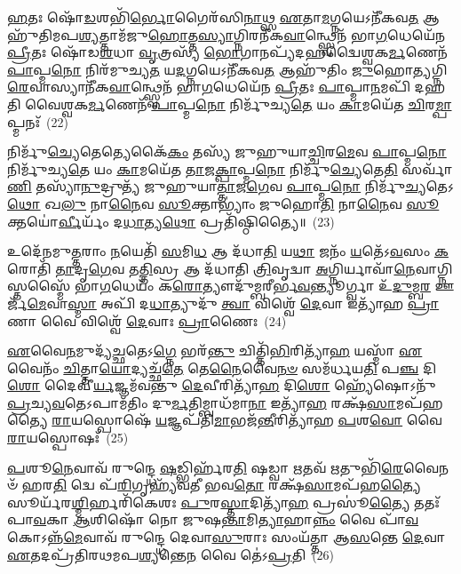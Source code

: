 \-\ul{𑌹}\-𑌤𑌃 𑌷𑍋᳴\-\ul{𑌡}\-𑌶𑌭𑌿᳴\-\ul{𑌰𑍍𑌭𑍋}\-𑌗𑍈𑌰᳴𑌸𑌿\-\ul{𑌨𑌾}\-𑌥𑍍𑌸 \ul{𑌏}\-𑌤𑌾\-\ul{𑌮}\-𑌗𑍍𑌨𑌯𑍇\-𑌽𑌨𑍀᳴𑌕𑌵\-\ul{𑌤} 𑌆𑌹𑍁᳴𑌤𑌿𑌮𑌪\-\ul{𑌶𑍍𑌯}\-𑌤𑍍𑌤𑌾𑌮᳴𑌜𑍁\-\ul{𑌹𑍋}\-𑌤𑍍𑌤\-\ul{𑌸𑍍𑌯𑌾}\-𑌗𑍍𑌨𑌿𑌰𑌨𑍀᳴𑌕\-\ul{𑌵𑌾}\-𑌨𑍍𑌥𑍍𑌸𑍍𑌵𑍇𑌨᳴ 𑌭𑌾\-\ul{𑌗}\-𑌧𑍇𑌯𑍇᳴𑌨 \ul{𑌪𑍍𑌰𑍀}\-𑌤𑌃 𑌷𑍋᳴𑌡\-\ul{𑌶}\-𑌧𑌾 \ul{𑌵𑍃}\-𑌤𑍍𑌰𑌸𑍍𑌯᳴ \ul{𑌭𑍋}\-𑌗𑌾𑌨𑌪𑍍𑌯᳴𑌦𑌹𑌦𑍍𑌵𑍈𑌶𑍍𑌵𑌕\-\ul{𑌰𑍍𑌮}\-𑌣𑍇𑌨᳴ \ul{𑌪𑌾}\-𑌪𑍍𑌮\-\ul{𑌨𑍋} 𑌨𑌿𑌰᳴𑌮𑍁𑌚𑍍𑌯\-\ul{𑌤} 𑌯\-\ul{𑌦}\-𑌗𑍍𑌨𑌯𑍇\-𑌽𑌨𑍀᳴𑌕𑌵\-\ul{𑌤} 𑌆𑌹𑍁᳴𑌤𑌿𑌂 \ul{𑌜𑍁}\-𑌹𑍋\-\ul{𑌤𑍍𑌯}\-𑌗𑍍𑌨𑌿\-\ul{𑌰𑍇}\-𑌵𑌾𑌸𑍍𑌯𑌾𑌨𑍀᳴𑌕\-\ul{𑌵𑌾}\-𑌨𑍍𑌥𑍍𑌸𑍍𑌵𑍇𑌨᳴ 𑌭𑌾\-\ul{𑌗}\-𑌧𑍇𑌯𑍇᳴𑌨 \ul{𑌪𑍍𑌰𑍀}\-𑌤𑌃 \ul{𑌪𑌾}\-𑌪𑍍𑌮𑌾\-\ul{𑌨}\-𑌮𑌪𑌿᳴ 𑌦𑌹𑌤𑌿 𑌵𑍈𑌶𑍍𑌵𑌕\-\ul{𑌰𑍍𑌮}\-𑌣𑍇𑌨᳴ \ul{𑌪𑌾}\-𑌪𑍍𑌮\-\ul{𑌨𑍋} 𑌨𑌿𑌰𑍍𑌮𑍁᳴𑌚𑍍𑌯\-\ul{𑌤𑍇} 𑌯𑌂 \ul{𑌕𑌾}\-𑌮𑌯𑍇᳴𑌤 \ul{𑌚𑌿}\-𑌰\-\ul{𑌮𑍍𑌪𑌾}\-𑌪𑍍𑌮𑌨𑌃᳴~(22)

𑌨𑌿𑌰𑍍𑌮𑍁᳴\-\ul{𑌚𑍍𑌯𑍇}\-𑌤𑍇𑌤𑍍𑌯𑍇𑌕𑍈᳴\-\ul{𑌕𑌂} 𑌤𑌸𑍍𑌯᳴ 𑌜𑍁𑌹𑍁𑌯𑌾\-\ul{𑌚𑍍𑌚𑌿}\-𑌰\-\ul{𑌮𑍇}\-𑌵 \ul{𑌪𑌾}\-𑌪𑍍𑌮\-\ul{𑌨𑍋} 𑌨𑌿𑌰𑍍𑌮𑍁᳴𑌚𑍍𑌯\-\ul{𑌤𑍇} 𑌯𑌂 \ul{𑌕𑌾}\-𑌮𑌯𑍇᳴𑌤 \ul{𑌤𑌾}\-𑌜\-\ul{𑌕𑍍𑌪𑌾}\-𑌪𑍍𑌮\-\ul{𑌨𑍋} 𑌨𑌿𑌰𑍍𑌮𑍁᳴\-\ul{𑌚𑍍𑌯𑍇}\-𑌤𑍇\-\ul{𑌤𑌿} 𑌸𑌰𑍍𑌵𑌾᳴\-\ul{𑌣𑌿} 𑌤𑌸𑍍𑌯𑌾᳴\-\ul{𑌨𑍁}\-𑌦𑍍𑌰𑍁𑌤𑍍𑌯᳴ 𑌜𑍁𑌹𑍁𑌯𑌾\-\ul{𑌤𑍍𑌤𑌾}\-𑌜\-\ul{𑌗𑍇}\-𑌵 \ul{𑌪𑌾}\-𑌪𑍍𑌮\-\ul{𑌨𑍋} 𑌨𑌿𑌰𑍍𑌮𑍁᳴\-\ul{𑌚𑍍𑌯}\-𑌤𑍇\-𑌽\-\ul{𑌥𑍋} 𑌖\-\ul{𑌲𑍁} 𑌨𑌾\-\ul{𑌨𑍈}\-𑌵 \ul{𑌸𑍂}\-𑌕𑍍𑌤𑌾\-𑌭𑍍𑌯𑌾𑌂॑ 𑌜𑍁𑌹𑍋\-\ul{𑌤𑌿} 𑌨𑌾\-\ul{𑌨𑍈}\-𑌵 \ul{𑌸𑍂}\-𑌕𑍍𑌤𑌯𑍋॑\-\ul{𑌰𑍍𑌵𑍀}\-𑌰𑍍𑌯𑌂᳴ 𑌦\-\ul{𑌧𑌾}\-𑌤𑍍𑌯\-\ul{𑌥𑍋} 𑌪𑍍𑌰𑌤𑌿᳴𑌷𑍍𑌠𑌿𑌤𑍍𑌯𑍈॥~(23)

{\anuvakamend[{\-\ul{𑌦𑍇}\-𑌵𑌾𑌃 𑌪𑍍𑌰𑌾᳴𑌜𑌾\-\ul{𑌪}\-𑌤𑍍𑌯𑍋 \ul{𑌵𑍃}\-𑌤𑍍𑌰\-\ul{𑌶𑍍𑌚𑌿}\-𑌰𑌂 \ul{𑌪𑌾}\-𑌪𑍍𑌮𑌨᳴𑌶𑍍𑌚𑌤𑍍𑌵𑌾\-\ul{𑌰𑌿}\-\-\ul{𑍞}\-𑌶𑌚𑍍𑌚᳴}]}%

𑌉𑌦𑍇᳴𑌨𑌮𑍁\-\ul{𑌤𑍍𑌤}\-𑌰𑌾𑌂 \ul{𑌨}\-𑌯𑍇𑌤𑌿᳴ \ul{𑌸}\-𑌮𑌿\-\ul{𑌧} 𑌆 𑌦᳴𑌧𑌾\-\ul{𑌤𑌿} 𑌯\-\ul{𑌥𑌾} 𑌜𑌨𑌂᳴ \ul{𑌯}\-𑌤𑍇᳴\-𑌽\-\ul{𑌵}\-𑌸𑌂 \ul{𑌕}\-𑌰𑍋𑌤𑌿᳴ \ul{𑌤𑌾}\-𑌦𑍃\-\ul{𑌗𑍇}\-𑌵 𑌤\-\ul{𑌤𑍍𑌤𑌿}\-𑌸𑍍𑌰 𑌆 𑌦᳴𑌧𑌾𑌤𑌿 \ul{𑌤𑍍𑌰𑌿}\-𑌵𑍃𑌦𑍍𑌵𑌾 \ul{𑌅}\-𑌗𑍍𑌨𑌿𑌰𑍍𑌯𑌾𑌵𑌾᳴\-\ul{𑌨𑍇}\-𑌵𑌾𑌗𑍍𑌨𑌿𑌸𑍍𑌤𑌸𑍍𑌮𑍈᳴ 𑌭𑌾\-\ul{𑌗}\-𑌧𑍇𑌯𑌂᳴ 𑌕\-\ul{𑌰𑍋}\-𑌤𑍍𑌯𑍗𑌦𑍁᳴𑌮𑍍𑌬𑌰𑍀𑌰𑍍𑌭\-\ul{𑌵}\-𑌨𑍍𑌤𑍍𑌯𑍂𑌰𑍍𑌗𑍍𑌵𑌾 𑌉᳴\-\ul{𑌦𑍁}\-𑌮𑍍𑌬\-\ul{𑌰} 𑌊𑌰𑍍𑌜᳴\-\ul{𑌮𑍇}\-𑌵𑌾\-\ul{𑌸𑍍𑌮𑌾} 𑌅𑌪𑌿᳴ 𑌦\-\ul{𑌧𑌾}\-𑌤𑍍𑌯𑍁𑌦𑍁᳴ \ul{𑌤𑍍𑌵𑌾} 𑌵𑌿𑌶𑍍𑌵𑍇᳴ \ul{𑌦𑍇}\-𑌵𑌾 𑌇𑌤𑍍𑌯𑌾᳴𑌹 \ul{𑌪𑍍𑌰𑌾}\-𑌣𑌾 𑌵𑍈 𑌵𑌿𑌶𑍍𑌵𑍇᳴ \ul{𑌦𑍇}\-𑌵𑌾𑌃 \ul{𑌪𑍍𑌰𑌾}\-𑌣𑍈𑌃~(24)

\-\ul{𑌏}\-𑌵𑍈\-\ul{𑌨}\-𑌮𑍁𑌦𑍍𑌯᳴\-\ul{𑌚𑍍𑌛}\-𑌤𑍇\-𑌽\-\ul{𑌗𑍍𑌨𑍇} 𑌭𑌰᳴\-\ul{𑌨𑍍𑌤𑍁} 𑌚𑌿𑌤𑍍𑌤𑌿᳴\-\ul{𑌭𑌿}\-𑌰𑌿𑌤𑍍𑌯𑌾᳴\-\ul{𑌹} 𑌯𑌸𑍍𑌮𑌾᳴ \ul{𑌏}\-𑌵𑍈𑌨𑌂᳴ \ul{𑌚𑌿}\-𑌤𑍍𑌤𑌾\-\ul{𑌯𑍋}\-𑌦𑍍𑌯𑌚𑍍𑌛᳴\-\ul{𑌤𑍇} 𑌤𑍇\-\ul{𑌨𑍈}\-𑌵𑍈\-\ul{𑌨}\-\-\ul{𑍞} 𑌸𑌮᳴𑌰𑍍𑌧𑌯\-\ul{𑌤𑌿} 𑌪\-\ul{𑌞𑍍𑌚} 𑌦𑌿\-\ul{𑌶𑍋} 𑌦𑍈𑌵𑍀॑\-\ul{𑌰𑍍𑌯}\-𑌜𑍍𑌞𑌮᳴𑌵𑌨𑍍𑌤𑍁 \ul{𑌦𑍇}\-𑌵𑍀𑌰𑌿𑌤𑍍𑌯𑌾᳴\-\ul{𑌹} 𑌦𑌿\-\ul{𑌶𑍋} 𑌹𑍍𑌯𑍇᳴𑌷𑍋\-𑌽𑌨𑍁᳴ \ul{𑌪𑍍𑌰}\-𑌚𑍍𑌯\-\ul{𑌵}\-𑌤𑍇\-𑌽𑌪𑌾𑌮᳴𑌤𑌿𑌂 𑌦𑍁\-\ul{𑌰𑍍𑌮}\-𑌤𑌿𑌮𑍍𑌬𑌾𑌧᳴𑌮𑌾\-\ul{𑌨𑌾} 𑌇𑌤𑍍𑌯𑌾᳴\-\ul{𑌹} 𑌰𑌕𑍍𑌷᳴\-\ul{𑌸𑌾}\-𑌮𑌪᳴𑌹𑌤𑍍𑌯𑍈 \ul{𑌰𑌾}\-𑌯𑌸𑍍𑌪𑍋𑌷𑍇᳴ \ul{𑌯}\-𑌜𑍍𑌞𑌪᳴𑌤𑌿\-\ul{𑌮𑌾}\-𑌭𑌜᳴\-\ul{𑌨𑍍𑌤𑍀}\-𑌰𑌿𑌤𑍍𑌯𑌾᳴𑌹 \ul{𑌪}\-𑌶\-\ul{𑌵𑍋} 𑌵𑍈 \ul{𑌰𑌾}\-𑌯𑌸𑍍𑌪𑍋𑌷𑌃᳴~(25)

\-\ul{𑌪}\-𑌶𑍂\-\ul{𑌨𑍇}\-𑌵𑌾𑌵᳴ 𑌰𑍁𑌨𑍍𑌦𑍍𑌧𑍇 \ul{𑌷}\-𑌡𑍍𑌭𑌿𑌰𑍍\mbox{}𑌹᳴𑌰\-\ul{𑌤𑌿} 𑌷𑌡𑍍𑌵𑌾 \ul{𑌋}\-𑌤𑌵᳴ \ul{𑌋}\-𑌤𑍁𑌭𑌿᳴\-\ul{𑌰𑍇}\-𑌵𑍈𑌨𑍞᳴ 𑌹𑌰\-\ul{𑌤𑌿} 𑌦𑍍𑌵𑍇 𑌪᳴\-\ul{𑌰𑌿}\-𑌗𑍃𑌹𑍍𑌯᳴𑌵𑌤𑍀 𑌭𑌵\-\ul{𑌤𑍋} 𑌰𑌕𑍍𑌷᳴\-\ul{𑌸𑌾}\-𑌮𑌪᳴𑌹\-\ul{𑌤𑍍𑌯𑍈} 𑌸𑍂𑌰𑍍𑌯᳴𑌰\-\ul{𑌶𑍍𑌮𑌿}\-𑌰𑍍\mbox{}𑌹𑌰𑌿᳴𑌕𑍇𑌶𑌃 \ul{𑌪𑍁}\-𑌰\-\ul{𑌸𑍍𑌤𑌾}\-𑌦𑌿𑌤𑍍𑌯𑌾᳴\-\ul{𑌹} 𑌪𑍍𑌰𑌸𑍂॑\-\ul{𑌤𑍍𑌯𑍈} 𑌤𑌤𑌃᳴ 𑌪𑌾\-\ul{𑌵}\-𑌕𑌾 \ul{𑌆}\-𑌶𑌿𑌷𑍋᳴ 𑌨𑍋 𑌜𑍁𑌷\-\ul{𑌨𑍍𑌤𑌾}\-𑌮𑌿\-\ul{𑌤𑍍𑌯𑌾}\-𑌹𑌾\-\ul{𑌨𑍍𑌨𑌂} 𑌵𑍈 𑌪𑌾᳴\-\ul{𑌵}\-𑌕𑍋\-𑌽𑌨𑍍𑌨᳴\-\ul{𑌮𑍇}\-𑌵𑌾𑌵᳴ 𑌰𑍁𑌨𑍍𑌦𑍍𑌧𑍇 𑌦𑍇𑌵𑌾\-\ul{𑌸𑍁}\-𑌰𑌾𑌃 𑌸𑌂𑌯᳴𑌤𑍍𑌤𑌾 𑌆\-\ul{𑌸}\-𑌨𑍍𑌤𑍇 \ul{𑌦𑍇}\-𑌵𑌾 \ul{𑌏}\-𑌤𑌦𑌪𑍍𑌰᳴𑌤𑌿𑌰𑌥𑌮𑌪\-\ul{𑌶𑍍𑌯}\-𑌨𑍍𑌤𑍇\-\ul{𑌨} 𑌵𑍈 𑌤𑍇॑\-𑌽\-\ul{𑌪𑍍𑌰}\-𑌤𑌿~(26)

